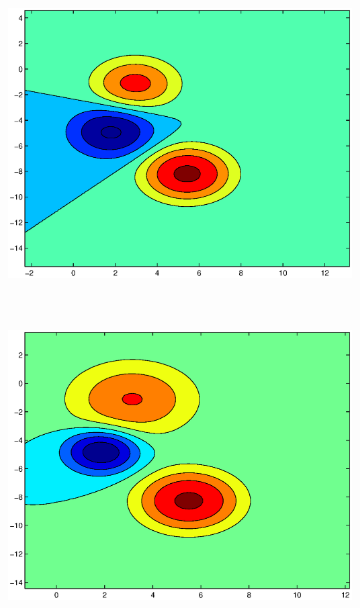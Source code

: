 \documentclass[useAMS,usenatbib,fleqn]{mn2e}
\begin{document}
\begin{figure}
         \begin{subfigure}[b]{0.3\columnwidth}
                \includegraphics[width=\textwidth]{figures/GL3.eps}
        \end{subfigure}
        ~
         \begin{subfigure}[b]{0.3\columnwidth}
                \includegraphics[width=\textwidth]{figures/VL3.eps}
        \end{subfigure}
        ~
        \begin{subfigure}[b]{0.3\columnwidth}

\end{subfigure}
\end{figure}
\end{document}
